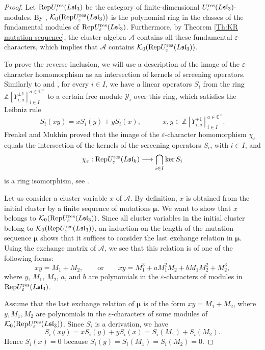 \documentclass[11pt, reqno]{amsart}
\theoremstyle{plain}
\theoremstyle{definition}
\numberwithin{equation}{section}
\newcommand{\CC}{{\mathbb {C}}}
\newcommand{\ZZ}{{\mathbb {Z}}}
\newcommand{\res}{{\rm res}}
\newcommand{\Rep}{{\rm Rep}}
\begin{document}
\begin{proof}
Let $\Rep U_{\varepsilon}^{\res}({L\mathfrak{sl}_{3}})$ be the category of finite-dimensional $U_{\varepsilon}^{\res}({L\mathfrak{sl}_{3}})$-modules. By \cite{ FM02,FR98}, $\mathcal{K}_0(\Rep U_{\varepsilon}^{\res}({L\mathfrak{sl}_{3}}))$ is the polynomial ring in the classes of the fundamental modules of $\Rep U_{\varepsilon}^{\res}({L\mathfrak{sl}_{3}})$. Furthermore, by Theorem \ref{Th:KR mutation sequence}, the cluster algebra $\mathcal{A}$ contains all these fundamental $\varepsilon$-characters, which implies that $\mathcal{A}$ contains $\mathcal{K}_0(\Rep U_{\varepsilon}^{\res}({L\mathfrak{sl}_{3}}))$.

To prove the reverse inclusion, we will use a description of the image of the $\varepsilon$-character homomorphism as an intersection of kernels of screening operators. Similarly to \cite[Section 7.1]{FR98} and \cite [Section 5.1]{HL16}, for every $i\in I$, we have a linear operators $S_i$ from the ring $\ZZ[Y^{\pm 1}_{i,a}]^{a \in \CC^\times}_{i\in I}$ to a certain free module $\mathcal{Y}_i$ over this ring, which satisfies the Leibniz rule 
\[
S_i(xy)=xS_i(y)+yS_i(x), \quad\quad\quad x,y \in \ZZ[Y^{\pm 1}_{i,a}]^{a \in \CC^\times}_{i\in I}.
\]
Frenkel and Mukhin proved that the image of the $\varepsilon$-character homomorphism $\chi_\varepsilon$
equals the intersection of the kernels of the screening operators $S_i$, with $i\in I$, and
\[
\chi_\varepsilon: \Rep U_\varepsilon^\res({L\mathfrak{sl}_k})\longrightarrow \bigcap_{i\in I} \ker S_i
\]
is a ring isomorphism, see \cite[Proposition 3.6]{FM02}.

Let us consider a cluster variable $x$ of $\mathcal{A}$. By definition, $x$ is obtained from the initial cluster by a finite sequence of mutations $\boldsymbol{\mu}$. We want to show that $x$ belongs to $\mathcal{K}_0(\Rep U_{\varepsilon}^{\res}({L\mathfrak{sl}_{3}}))$. Since all cluster variables in the initial cluster belong to $\mathcal{K}_0(\Rep U_{\varepsilon}^{\res}(L\mathfrak{sl}_{3}))$, an induction on the length of the mutation sequence $\boldsymbol{\mu}$ shows that it suffices to consider the last exchange relation in $\boldsymbol{\mu}$. Using the exchange matrix of $\mathcal{A}$, we see that this relation is of one of the following forms:
\[
xy=M_1+M_2, \qquad \text{or} \qquad xy=M_1^3+aM_1^2M_2+bM_1M_2^2+M_2^3,
\]
where $y$, $M_1$, $M_2$, $a$, and $b$ are polynomials in the $\varepsilon$-characters of modules in $\Rep U_{\varepsilon}^{\res}(L\mathfrak{sl}_{3})$.

Assume that the last exchange relation of $\boldsymbol{\mu}$ is of the form $xy=M_1+M_2$, where $y, M_1, M_2$ are polynomials in the $\varepsilon$-characters of some modules of $\mathcal{K}_0(\Rep U_{\varepsilon}^{\res}({L\mathfrak{sl}_{3}}))$. Since $S_i$ is a derivation, we have 
\[
S_i(xy)=xS_i(y)+yS_i(x)=S_i(M_1)+S_i(M_2).
\]
Hence $S_i(x)=0$ because $S_i(y)=S_i(M_1)=S_i(M_2)=0$. 


\end{proof}
\end{document}
